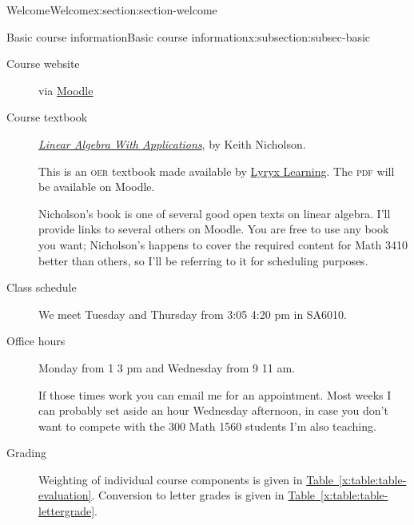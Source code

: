 \documentclass[oneside,10pt,]{article}
\newcommand{\initialism}[1]{\textsc{\MakeLowercase{#1}}}
\begin{document}
\begin{sectionptx}{Welcome}{}{Welcome}{}{}{x:section:section-welcome}
%
%
\typeout{************************************************}
\typeout{************************************************}
%
\begin{subsectionptx}{Basic course information}{}{Basic course information}{}{}{x:subsection:subsec-basic}
%
\begin{description}
\item[{Course website}]via \href{https://moodle.uleth.ca}{Moodle}%
\item[{Course textbook}]\href{https://lila1.lyryx.com/textbooks/OPEN_LAWA_1/marketing/Nicholson-OpenLAWA-2019A.pdf}{\emph{Linear Algebra With Applications}}, by Keith Nicholson.%
\par
This is an \initialism{OER} textbook made available by \href{https://lyryx.com/}{Lyryx Learning}. The \initialism{PDF} will be available on Moodle.%
\par
Nicholson's book is one of several good open texts on linear algebra. I'll provide links to several others on Moodle. You are free to use any book you want; Nicholson's happens to cover the required content for Math 3410 better than others, so I'll be referring to it for scheduling purposes.%
\item[{Class schedule}]We meet Tuesday and Thursday from 3:05 \textendash{} 4:20 pm in SA6010.%
\item[{Office hours}]Monday from 1 \textendash{} 3 pm and Wednesday from 9 \textendash{} 11 am.%
\par
If those times work you can email me for an appointment. Most weeks I can probably set aside an hour Wednesday afternoon, in case you don't want to compete with the 300 Math 1560 students I'm also teaching.%
\item[{Grading}]Weighting of individual course components is given in \hyperref[x:table:table-evaluation]{Table~\ref{x:table:table-evaluation}}. Conversion to letter grades is given in \hyperref[x:table:table-lettergrade]{Table~\ref{x:table:table-lettergrade}}.%
\end{description}
%
\end{subsectionptx}
\end{sectionptx}
%
%
\typeout{************************************************}
\typeout{************************************************}
%
\end{document}
